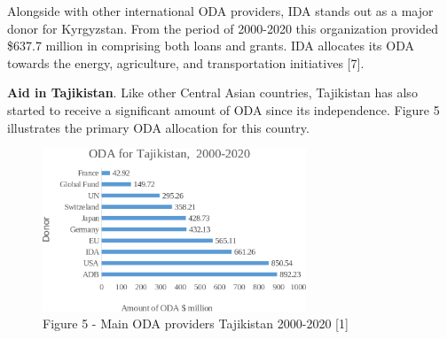 \begin{multicols}{2}
Alongside with other international ODA providers, IDA stands out as a
major donor for Kyrgyzstan. From the period of 2000-2020 this
organization provided \$637.7 million in comprising both loans and
grants. IDA allocates its ODA towards the energy, agriculture, and
transportation initiatives {[}7{]}.

{\bfseries Aid in Tajikistan}. Like other Central Asian countries,
Tajikistan has also started to receive a significant amount of ODA since
its independence. Figure 5 illustrates the primary ODA allocation for
this country.
\end{multicols}

\begin{figure}[H]
	\centering
	\includegraphics[width=0.7\textwidth]{assets/341.4}
	\caption*{Figure 5 - Main ODA providers Tajikistan 2000-2020 {[}1{]}}
\end{figure}

